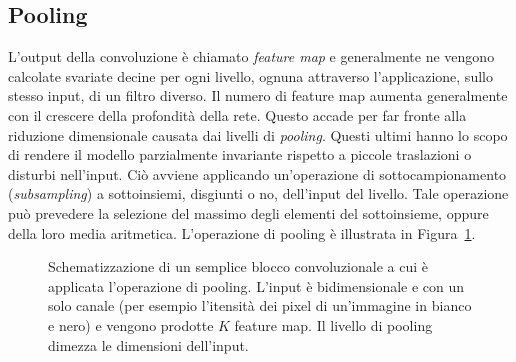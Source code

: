 \subsection{Pooling}
L'output della convoluzione è chiamato \emph{feature map} e generalmente ne
vengono calcolate svariate decine per ogni livello, ognuna attraverso
l'applicazione, sullo stesso input, di un filtro diverso. Il numero di feature
map aumenta generalmente con il crescere della profondità della rete. Questo
accade per far fronte alla riduzione dimensionale causata dai livelli di
\emph{pooling}. Questi ultimi hanno lo scopo di rendere il modello parzialmente
invariante rispetto a piccole traslazioni o disturbi nell'input. Ciò avviene
applicando un'operazione di sottocampionamento (\emph{subsampling}) a
sottoinsiemi, disgiunti o no, dell'input del livello. Tale operazione può prevedere la
selezione del massimo degli elementi del sottoinsieme, oppure della loro media
aritmetica. L'operazione di pooling è illustrata in Figura~\ref{fig:pooling}.
\begin{figure}[!htp]
  \caption{%
    Schematizzazione di un semplice blocco convoluzionale a cui è applicata
    l'operazione di pooling. L'input è bidimensionale e con un solo canale (per
    esempio l'itensità dei pixel di un'immagine in bianco e nero) e vengono
    prodotte \(K\) feature map. Il livello di pooling dimezza le dimensioni
    dell'input.
  }%
  \label{fig:pooling}
\end{figure}




